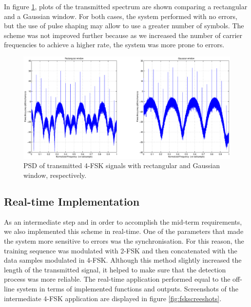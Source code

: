 \documentclass[12pt,a4paper,openright]{report}
\begin{document}
In figure \ref{fig:4FSKspectrum}, plots of the transmitted spectrum are shown comparing a rectangular and a Gaussian window. For both cases, the system performed with no errors, but the use of pulse shaping may allow to use a greater number of symbols. The scheme was not improved further because as we increased the number of carrier frequencies to achieve a higher rate, the system was more prone to errors. 

\begin{figure}[H]
  \centering
    \includegraphics[width=1.0\textwidth]{4FSKspectrum_windoweffect.eps}
    \caption[PSD of transmitted 4-FSK signals.]{PSD of transmitted 4-FSK signals with rectangular and Gaussian window, respectively.}
    \label{fig:4FSKspectrum}
\end{figure}


\subsection{Real-time Implementation}

As an intermediate step and in order to accomplish the mid-term requirements, we also implemented this scheme in real-time. One of the parameters that made the system more sensitive to errors was the synchronisation. For this reason, the training sequence was modulated with 2-FSK and then concatenated with the data samples modulated in 4-FSK. Although this method slightly increased the length of the transmitted signal, it helped to make sure that the detection process was more reliable. The real-time application performed equal to the off-line system in terms of implemented functions and outputs. Screenshots of the intermediate 4-FSK application are displayed in figure \ref{fig:fskscreeshots}.
\end{document}
